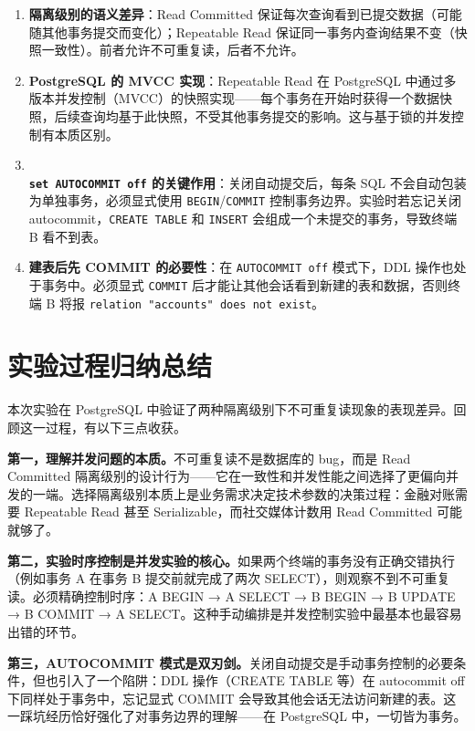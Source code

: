 \documentclass[12pt, a4paper]{academics}
\begin{document}
\begin{enumerate}
    \item \textbf{隔离级别的语义差异}：Read Committed 保证每次查询看到已提交数据（可能随其他事务提交而变化）；Repeatable Read 保证同一事务内查询结果不变（快照一致性）。前者允许不可重复读，后者不允许。
    \item \textbf{PostgreSQL 的 MVCC 实现}：Repeatable Read 在 PostgreSQL 中通过多版本并发控制（MVCC）的快照实现——每个事务在开始时获得一个数据快照，后续查询均基于此快照，不受其他事务提交的影响。这与基于锁的并发控制有本质区别。
    \item \textbf{\texttt{\\set~AUTOCOMMIT~off} 的关键作用}：关闭自动提交后，每条 SQL 不会自动包装为单独事务，必须显式使用 \texttt{BEGIN}/\texttt{COMMIT} 控制事务边界。实验时若忘记关闭 autocommit，\texttt{CREATE TABLE} 和 \texttt{INSERT} 会组成一个未提交的事务，导致终端 B 看不到表。
    \item \textbf{建表后先 COMMIT 的必要性}：在 \texttt{AUTOCOMMIT off} 模式下，DDL 操作也处于事务中。必须显式 \texttt{COMMIT} 后才能让其他会话看到新建的表和数据，否则终端 B 将报 \texttt{relation "accounts" does not exist}。
\end{enumerate}

\section{实验过程归纳总结}

本次实验在 PostgreSQL 中验证了两种隔离级别下不可重复读现象的表现差异。回顾这一过程，有以下三点收获。

\textbf{第一，理解并发问题的本质。}不可重复读不是数据库的 bug，而是 Read Committed 隔离级别的设计行为——它在一致性和并发性能之间选择了更偏向并发的一端。选择隔离级别本质上是业务需求决定技术参数的决策过程：金融对账需要 Repeatable Read 甚至 Serializable，而社交媒体计数用 Read Committed 可能就够了。

\textbf{第二，实验时序控制是并发实验的核心。}如果两个终端的事务没有正确交错执行（例如事务 A 在事务 B 提交前就完成了两次 SELECT），则观察不到不可重复读。必须精确控制时序：A BEGIN → A SELECT → B BEGIN → B UPDATE → B COMMIT → A SELECT。这种手动编排是并发控制实验中最基本也最容易出错的环节。

\textbf{第三，AUTOCOMMIT 模式是双刃剑。}关闭自动提交是手动事务控制的必要条件，但也引入了一个陷阱：DDL 操作（CREATE TABLE 等）在 autocommit off 下同样处于事务中，忘记显式 COMMIT 会导致其他会话无法访问新建的表。这一踩坑经历恰好强化了对事务边界的理解——在 PostgreSQL 中，一切皆为事务。
\end{document}

